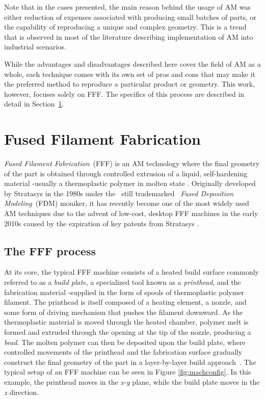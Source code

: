 \documentclass[main.tex]{subfiles}
\begin{document}
Note that in the cases presented, the main reason behind the usage of AM was either reduction of expenses associated with producing small batches of parts, or the capability of reproducing a unique and complex geometry. This is a trend that is observed in most of the literature describing implementation of AM into industrial scenarios.

While the advantages and disadvantages described here cover the field of AM as a whole, each technique comes with its own set of pros and cons that may make it the preferred method to reproduce a particular product or geometry. This work, however, focuses solely on FFF. The specifics of this process are described in detail in Section~\ref{sec:FFF}.

\section{Fused Filament Fabrication}\label{sec:FFF} 
\emph{Fused Filament Fabrication}~(FFF) is an AM technology where the final geometry of the part is obtained through controlled extrusion of a liquid, self-hardening material -usually a thermoplastic polymer in molten state \cite{Gibson2015}. Originally developed by Stratasys in the 1980s under the \textendash~still trademarked \textendash~\emph{Fused Deposition Modeling}~(FDM\texttrademark) moniker, it has recently become one of the most widely used AM techniques due to the advent of low-cost, desktop FFF machines in the early 2010s caused by the expiration of key patents from Stratasys \cite{Gibson2015,Capote2017}. 
\pagebreak
\subsection{The FFF process}\label{ssec:FFFmach}
At its core, the typical FFF machine consists of a heated build surface commonly referred to as a \emph{build plate}, a specialized tool known as a \emph{printhead}, and the fabrication material -supplied in the form of spools of thermoplastic polymer filament. The printhead is itself composed of a heating element, a nozzle, and some form of driving mechanism that pushes the filament downward. As the thermoplastic material is moved through the heated chamber, polymer melt is formed and extruded through the opening at the tip of the nozzle, producing a \emph{bead}. The molten polymer can then be deposited upon the build plate, where controlled movements of the printhead and the fabrication surface gradually construct the final geometry of the part in a layer-by-layer build approach~\cite{Gibson2015}. The typical setup of an FFF machine can be seen in Figure \ref{fig:machconfig}. In this example, the printhead moves in the \emph{x-y} plane, while the build plate moves in the \emph{z} direction. 
 
\end{document}
